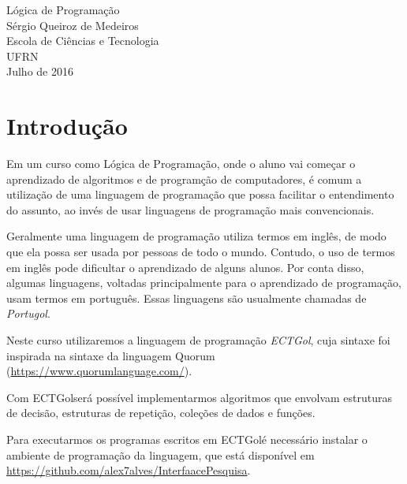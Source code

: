\documentclass{report}
\newcommand{\Egol}{ECTGol\;}
\begin{document}
\thispagestyle{empty}
\begin{center}

\begin{center}
\end{center}
\vspace{6cm}
\Huge{Lógica de Programação}\\
\vspace{1.5cm}
\Large{Sérgio Queiroz de Medeiros} \\
\Large{Escola de Ciências e Tecnologia} \\
\Large{UFRN}
\vspace{5cm}
\\
\large{Julho de 2016}
\end{center}

\tableofcontents

\pagebreak




\chapter{Introdução}

Em um curso como Lógica de Programação, onde o aluno
vai começar o aprendizado de algoritmos e de programção
de computadores, é comum a utilização de uma linguagem
de programação que possa facilitar o entendimento do
assunto, ao invés de usar linguagens de programação
mais convencionais.

Geralmente uma linguagem de programação utiliza termos em inglês,
de modo que ela possa ser usada por pessoas de todo o mundo.
Contudo, o uso de termos em inglês pode dificultar o aprendizado
de alguns alunos. Por conta disso, algumas linguagens, voltadas
principalmente para o aprendizado de programação, usam termos em
português. Essas linguagens são usualmente chamadas de \emph{Portugol}.

Neste curso utilizaremos a linguagem de programação \emph{\Egol},
cuja sintaxe foi inspirada na sintaxe da linguagem Quorum
(\url{https://www.quorumlanguage.com/}).

Com \Egol será possível implementarmos algoritmos que envolvam
estruturas de decisão, estruturas de repetição, coleções de dados
e funções.

Para executarmos os programas escritos em \Egol é necessário
instalar o ambiente de programação da linguagem, que está disponível em
\url{https://github.com/alex7alves/InterfaacePesquisa}.
\end{document}
